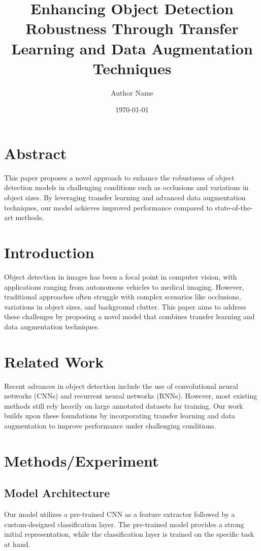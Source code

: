 \documentclass{article}
\title{Enhancing Object Detection Robustness Through Transfer Learning and Data Augmentation Techniques}
\author{Author Name}
\date{\today}
\begin{document}
\maketitle

\section{Abstract}
This paper proposes a novel approach to enhance the robustness of object detection models in challenging conditions such as occlusions and variations in object sizes. By leveraging transfer learning and advanced data augmentation techniques, our model achieves improved performance compared to state-of-the-art methods.

\section{Introduction}
Object detection in images has been a focal point in computer vision, with applications ranging from autonomous vehicles to medical imaging. However, traditional approaches often struggle with complex scenarios like occlusions, variations in object sizes, and background clutter. This paper aims to address these challenges by proposing a novel model that combines transfer learning and data augmentation techniques.

\section{Related Work}
Recent advances in object detection include the use of convolutional neural networks (CNNs) and recurrent neural networks (RNNs). However, most existing methods still rely heavily on large annotated datasets for training. Our work builds upon these foundations by incorporating transfer learning and data augmentation to improve performance under challenging conditions.

\section{Methods/Experiment}
\subsection{Model Architecture}
Our model utilizes a pre-trained CNN as a feature extractor followed by a custom-designed classification layer. The pre-trained model provides a strong initial representation, while the classification layer is trained on the specific task at hand.
\end{document}
